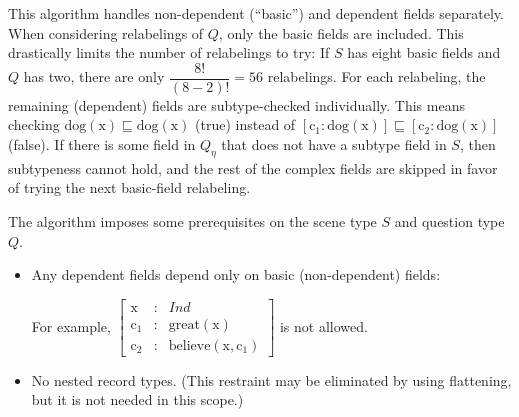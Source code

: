 This algorithm handles non-dependent (``basic'') and dependent fields separately.
When considering relabelings of $Q$, only the basic fields are included.
This drastically limits the number of relabelings to try:
If $S$ has eight basic fields and $Q$ has two, there are only $\dfrac{8!}{(8-2)!} = 56$ relabelings.
For each relabeling, the remaining (dependent) fields are subtype-checked individually.
This means checking
$\text{dog}(\text{x}) \sqsubseteq \text{dog}(\text{x})$ (true) instead of
$[\text{c}_1 : \text{dog}(\text{x})] \sqsubseteq [\text{c}_2 : \text{dog}(\text{x})]$ (false).
If there is some field in $Q_\eta$ that does not have a subtype field in $S$, then subtypeness cannot hold, and the rest of the complex fields are skipped in favor of trying the next basic-field relabeling.

The algorithm imposes some prerequisites on the scene type $S$ and question type $Q$.

\begin{itemize}
\item Any dependent fields depend only on basic (non-dependent) fields:

For example, $\left[\begin{array}{rcl}
\text{x} &:& Ind \\
\text{c}_1 &:& \text{great}(\text{x}) \\
\text{c}_2 &:& \text{believe}(\text{x}, \text{c}_1)
\end{array}\right]$ is not allowed.

\item No nested record types.
(This restraint may be eliminated by using flattening, but it is not needed in this scope.)
\end{itemize}

